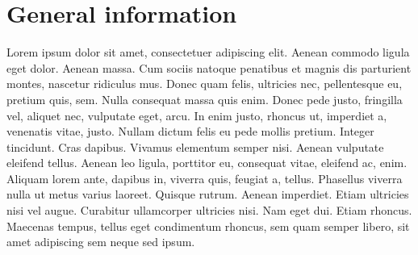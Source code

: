 \section{General information}

Lorem ipsum dolor sit amet, consectetuer adipiscing 
elit. Aenean commodo ligula eget dolor. Aenean massa.
Cum sociis natoque penatibus et magnis dis parturient
montes, nascetur ridiculus mus. Donec quam felis, 
ultricies nec, pellentesque eu, pretium quis, sem. 
Nulla consequat massa quis enim. Donec pede justo, 
fringilla vel, aliquet nec, vulputate eget, arcu. In 
enim justo, rhoncus ut, imperdiet a, venenatis vitae,
justo. Nullam dictum felis eu pede mollis pretium. 
Integer tincidunt. Cras dapibus. Vivamus elementum 
semper nisi. Aenean vulputate eleifend tellus. Aenean 
leo ligula, porttitor eu, consequat vitae, eleifend 
ac, enim. Aliquam lorem ante, dapibus in, viverra 
quis, feugiat a, tellus. Phasellus viverra nulla ut 
metus varius laoreet. Quisque rutrum. Aenean imperdiet.
Etiam ultricies nisi vel augue. Curabitur ullamcorper 
ultricies nisi. Nam eget dui. Etiam rhoncus. Maecenas 
tempus, tellus eget condimentum rhoncus, sem quam 
semper libero, sit amet adipiscing sem neque sed ipsum.